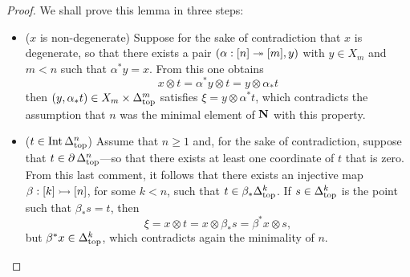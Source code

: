 \begin{proof}
    We shall prove this lemma in three steps:
    \begin{itemize}\setlength\itemsep{0em}
        \item (\(x\) is non-degenerate) Suppose for the sake of contradiction that \(x\)
              is degenerate, so that there exists a pair \((\alpha: [n] \twoheadrightarrow [m], y)\) with
              \(y \in X_m\) and \(m < n\) such that \(\alpha^{*} y = x\). From this one
              obtains
              \[
                  x \otimes t = \alpha^{*} y \otimes t = y \otimes \alpha_{*} t
              \]
              then \((y, \alpha_{*} t) \in X_m \times \Delta_{\text{top}}^m\) satisfies
              \(\xi = y \otimes \alpha^{*} t\), which contradicts the assumption that \(n\)
              was the minimal element of \(\mathbf{N}\) with this property.

        \item (\(t \in \operatorname{Int} \Delta_{\text{top}}^n\)) Assume that \(n \geq 1\) and, for the sake of
              contradiction, suppose that \(t \in \operatorname{\partial} \Delta_{\text{top}}^n\)---so that there exists
              at least one coordinate of \(t\) that is zero. From this last comment, it
              follows that there exists an injective map \(\beta: [k] \rightarrowtail [n]\), for some
              \(k < n\), such that \(t \in \beta_{*} \Delta_{\text{top}}^k\). If \(s \in \Delta_{\text{top}}^k\) is
              the point such that \(\beta_{*} s = t\), then
              \[
                  \xi = x \otimes t = x \otimes \beta_{*} s = \beta^{*} x \otimes s,
              \]
              but \(\beta^{*} x \in \Delta_{\text{top}}^k\), which contradicts again the minimality of
              \(n\).


\end{itemize}
\end{proof}
